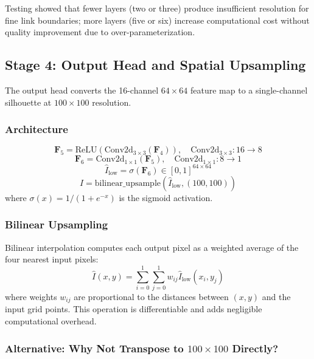 \documentclass[12pt,a4paper,oneside]{report}
\begin{document}
Testing showed that fewer layers (two or three) produce insufficient resolution for fine link boundaries; more layers (five or six) increase computational cost without quality improvement due to over-parameterization.

\subsection{Stage 4: Output Head and Spatial Upsampling}

The output head converts the 16-channel $64 \times 64$ feature map to a single-channel silhouette at $100 \times 100$ resolution.

\subsubsection{Architecture}

\begin{equation}
\mathbf{F}_5 = \text{ReLU}(\text{Conv2d}_{3\times3}(\mathbf{F}_4)), \quad \text{Conv2d}_{3\times3}: 16 \rightarrow 8
\end{equation}
\begin{equation}
\mathbf{F}_6 = \text{Conv2d}_{1\times1}(\mathbf{F}_5), \quad \text{Conv2d}_{1\times1}: 8 \rightarrow 1
\end{equation}
\begin{equation}
\hat{I}_{\text{low}} = \sigma(\mathbf{F}_6) \in [0, 1]^{64 \times 64}
\end{equation}
\begin{equation}
\hat{I} = \text{bilinear\_upsample}(\hat{I}_{\text{low}}, (100, 100))
\end{equation}
where $\sigma(x) = 1/(1 + e^{-x})$ is the sigmoid activation.

\subsubsection{Bilinear Upsampling}

Bilinear interpolation computes each output pixel as a weighted average of the four nearest input pixels:
\begin{equation}
\hat{I}(x,y) = \sum_{i=0}^{1}\sum_{j=0}^{1} w_{ij} \hat{I}_{\text{low}}(x_i, y_j)
\end{equation}
where weights $w_{ij}$ are proportional to the distances between $(x,y)$ and the input grid points. This operation is differentiable and adds negligible computational overhead.

\subsubsection{Alternative: Why Not Transpose to $100 \times 100$ Directly?}
\end{document}
